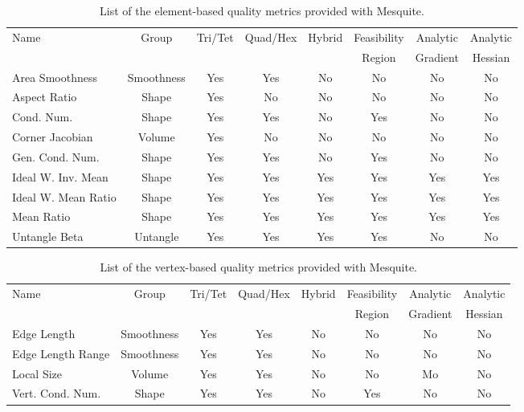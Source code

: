 \begin{table}[!hp]
\begin{center}
\begin{tabular}{|l|c|c|c|c|c|c|c|}
\hline
Name               & Group      & Tri/Tet & Quad/Hex & Hybrid & Feasibility & Analytic & Analytic \\
                   &            &         &          &        & Region      & Gradient & Hessian  \\
\hline
Area Smoothness    & Smoothness & Yes     & Yes      & No     & No          & No       & No \\
Aspect Ratio       & Shape      & Yes     & No       & No     & No          & No       & No \\
Cond. Num.         & Shape      & Yes     & Yes      & No     & Yes         & No       & No \\
Corner Jacobian    & Volume     & Yes     & No       & No     & No          & No       & No \\
Gen. Cond. Num.    & Shape      & Yes     & Yes      & No     & Yes         & No       & No \\
Ideal W. Inv. Mean & Shape      & Yes     & Yes      & Yes    & Yes         & Yes      & Yes \\
Ideal W. Mean Ratio& Shape      & Yes     & Yes      & Yes    & Yes         & Yes      & Yes \\
Mean Ratio         & Shape      & Yes     & Yes      & Yes    & Yes         & Yes      & Yes \\
Untangle Beta      & Untangle   & Yes     & Yes      & Yes    & Yes         & No       & No \\
\hline
\end{tabular}
\label{Element Metrics}
\caption{List of the element-based quality metrics provided with Mesquite.}
\end{center}
\end{table}

\begin{table}[!hp]
\begin{center}
\begin{tabular}{|l|c|c|c|c|c|c|c|}
\hline
Name               & Group      & Tri/Tet & Quad/Hex & Hybrid & Feasibility & Analytic & Analytic \\
                   &            &         &          &        & Region      & Gradient & Hessian  \\
\hline
Edge Length        & Smoothness & Yes     & Yes      & No     & No          & No       & No       \\
Edge Length Range  & Smoothness & Yes     & Yes      & No     & No          & No       & No       \\
Local Size         & Volume     & Yes     & Yes      & No     & No          & Mo       & No       \\
Vert. Cond. Num.   & Shape      & Yes     & Yes      & No     & Yes         & No       & No       \\
\hline
\end{tabular}
\label{Vertex Metrics}
\caption{List of the vertex-based quality metrics provided with Mesquite.}
\end{center}
\end{table}

